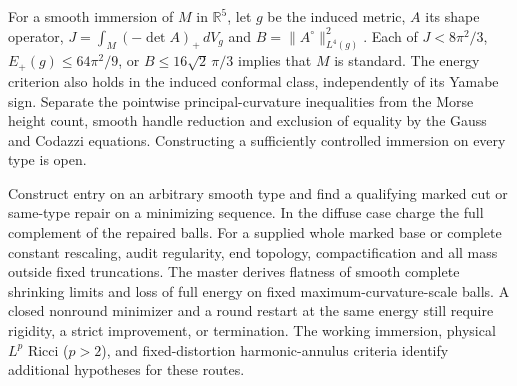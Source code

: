\begin{proposition}
\label{prop:master-immersion}
For a smooth immersion of \(M\) in \(\mathbb R^5\), let \(g\) be the
induced metric, \(A\) its shape operator, \(J=\int_M(-\det A)_+\,dV_g\)
and \(B=\|A^\circ\|_{L^4(g)}^2\). Each of \(J<8\pi^2/3\),
\(E_+(g)\le64\pi^2/9\), or \(B\le16\sqrt{2}\,\pi/3\) implies that
\(M\) is standard. The energy criterion also holds in the induced
conformal class, independently of its Yamabe sign. Separate the
pointwise principal-curvature inequalities from the Morse height
count, smooth handle reduction and exclusion of equality by the
Gauss and Codazzi equations. Constructing a sufficiently controlled
immersion on every type is open.
\end{proposition}

\begin{openproblem}
\label{problem:master-realization}
Construct entry on an arbitrary smooth type and find a qualifying
marked cut or same-type repair on a minimizing sequence. In the diffuse
case charge the full complement of the repaired balls. For a supplied
whole marked base or complete constant rescaling, audit regularity,
end topology, compactification and all mass outside fixed truncations.
The master derives flatness of smooth complete shrinking limits and
loss of full energy on fixed maximum-curvature-scale balls. A closed
nonround minimizer and a round restart at the same energy still require
rigidity, a strict improvement, or termination. The working immersion,
physical \(L^p\) Ricci (\(p>2\)), and fixed-distortion harmonic-annulus
criteria identify additional hypotheses for these routes.
\end{openproblem}

